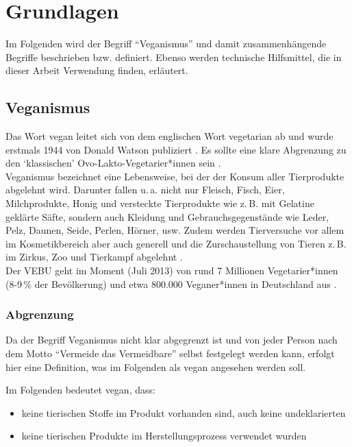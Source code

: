 \chapter{Grundlagen}
\label{chap:fundamentals}

Im Folgenden wird der Begriff "`Veganismus"' und damit zusammenhängende
Begriffe beschrieben bzw. definiert. Ebenso werden technische
Hilfsmittel, die in dieser Arbeit Verwendung finden, erläutert.

\section{Veganismus}

Das Wort vegan leitet sich von dem englischen Wort vegetarian ab und
wurde erstmals 1944 von Donald Watson publiziert \cite[S. 2]{wat44}.
Es sollte eine klare Abgrenzung zu den `klassischen'
Ovo-Lakto-Vegetarier*innen sein \cite[S. 75\,f.]{bre05}.\\
Veganismus bezeichnet eine Lebensweise, bei der der Konsum aller
Tierprodukte abgelehnt wird. Darunter fallen u.\,a. nicht nur Fleisch, Fisch,
Eier, Milchprodukte, Honig und versteckte Tierprodukte wie z.\,B. mit
Gelatine geklärte Säfte, sondern auch Kleidung und
Gebrauchsgegenstände wie Leder, Pelz, Daunen, Seide, Perlen, Hörner,
usw.
Zudem werden Tierversuche vor allem im Kosmetikbereich aber auch
generell und
die Zurschaustellung von Tieren z.\,B. im Zirkus, Zoo und
Tierkampf abgelehnt \cite[S. 74]{bre05}.\\
Der \ac{VEBU} geht im Moment (Juli 2013) von rund 7 Millionen
Vegetarier*innen (8-9\,\% der Bevölkerung) und etwa 800.000
Veganer*innen in Deutschland aus .

\subsection{Abgrenzung}

Da der Begriff Veganismus nicht klar abgegrenzt ist und von
jeder Person nach dem Motto "`Vermeide das Vermeidbare"' selbst
festgelegt werden kann, erfolgt hier eine Definition, was im Folgenden
als vegan angesehen werden soll.

Im Folgenden bedeutet vegan, dass:
\begin{itemize}
	\item keine tierischen Stoffe im Produkt vorhanden sind, auch
			keine undeklarierten
	\item keine tierischen Produkte im Herstellungsprozess verwendet
			wurden
\end{itemize}

